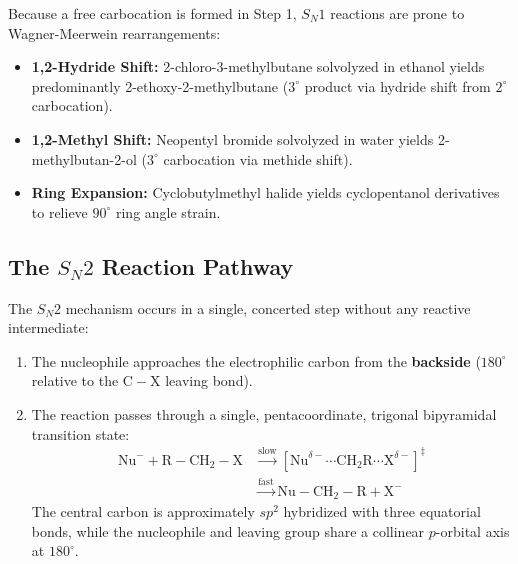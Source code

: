 \documentclass[10pt,twoside,openright]{book}
\begin{document}
\begin{usecasebox}
Because a free carbocation is formed in Step 1, $S_N1$ reactions are prone to Wagner-Meerwein rearrangements:
\begin{itemize}
  \item \textbf{1,2-Hydride Shift:} 2-chloro-3-methylbutane solvolyzed in ethanol yields predominantly 2-ethoxy-2-methylbutane ($3^\circ$ product via hydride shift from $2^\circ$ carbocation).
  \item \textbf{1,2-Methyl Shift:} Neopentyl bromide solvolyzed in water yields 2-methylbutan-2-ol ($3^\circ$ carbocation via methide shift).
  \item \textbf{Ring Expansion:} Cyclobutylmethyl halide yields cyclopentanol derivatives to relieve $90^\circ$ ring angle strain.
\end{itemize}
\end{usecasebox}

\subsection{The \texorpdfstring{$S_N2$}{SN2} Reaction Pathway}

\begin{conceptbox}
The $S_N2$ mechanism occurs in a single, concerted step without any reactive intermediate:
\begin{enumerate}[leftmargin=*]
  \item The nucleophile approaches the electrophilic carbon from the \textbf{backside} ($180^\circ$ relative to the $\mathrm{C-X}$ leaving bond).
  \item The reaction passes through a single, pentacoordinate, trigonal bipyramidal transition state:
  \begin{align}
    \mathrm{Nu}^- + \mathrm{R-CH_2-X} &\xrightarrow{\text{slow}} \left[ \mathrm{Nu}^{\delta-}\cdots \mathrm{CH_2R} \cdots \mathrm{X}^{\delta-} \right]^\ddagger \\
    &\xrightarrow{\text{fast}} \mathrm{Nu-CH_2-R} + \mathrm{X}^-
  \end{align}
  The central carbon is approximately $sp^2$ hybridized with three equatorial bonds, while the nucleophile and leaving group share a collinear $p$-orbital axis at $180^\circ$.
\end{enumerate}
\end{conceptbox}
\end{document}
